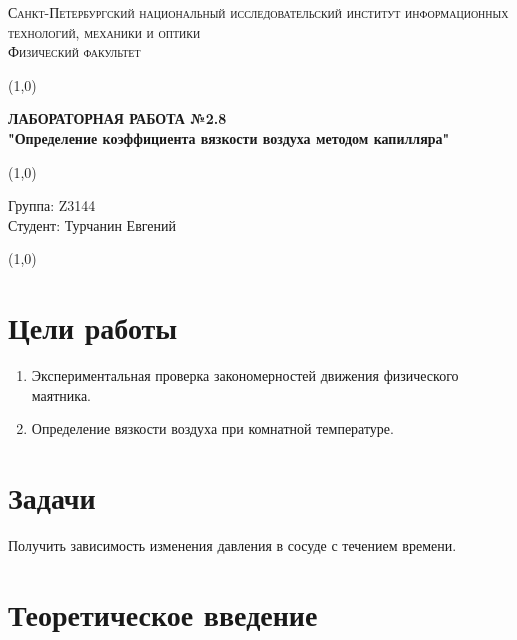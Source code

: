 \documentclass[a4paper]{article}
\date{}
\begin{document}
\begin{center}
\textsc{Санкт-Петербургский национальный исследовательский институт информационных технологий, механики и оптики\\[3mm]
Физический факультет} \\[3mm]

\end{center}
\vspace{5mm}
\line(1,0){\textwidth}
\begin{center}
\textbf{ЛАБОРАТОРНАЯ РАБОТА №2.8\\}
\textbf{"Определение коэффициента вязкости воздуха методом капилляра"}
\end{center}
\vspace{2mm}
\line(1,0){\textwidth}
\vspace{5mm}
\begin{minipage}{0.4\textwidth}
    Группа: Z3144 \\
    Студент: Турчанин Евгений\\
    \vspace{1mm}
\end{minipage}
\hfill
\vspace{1mm}
\line(1,0){\textwidth}

\section{\textbf{Цели работы}}
\begin{enumerate}
	\item Экспериментальная проверка закономерностей движения физического маятника.
    \item Определение вязкости воздуха при комнатной температуре.
\end{enumerate}

\section {\textbf{Задачи}}
Получить зависимость изменения давления в сосуде с течением времени.


\section{\textbf{Теоретическое введение}}
\end{document}

